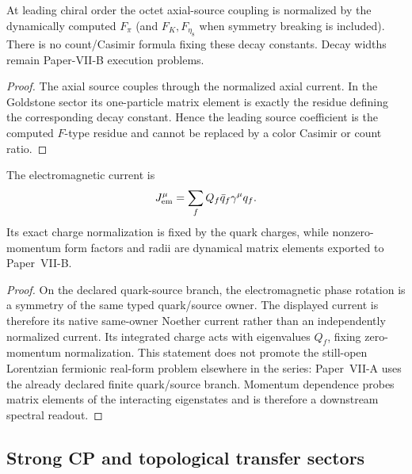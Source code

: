 \documentclass[12pt,a4paper]{article}
\begin{document}
\begin{theorem}
\label{p10:thm:native-leading-pseudoscalar-weak-decays}
At leading chiral order the octet axial-source coupling is normalized by the dynamically computed \(F_\pi\) (and \(F_K,F_{\eta_8}\) when symmetry breaking is included).  There is no count/Casimir formula fixing these decay constants.  Decay widths remain Paper-VII-B execution problems.
\end{theorem}
\begin{proof}
The axial source couples through the normalized axial current.  In the Goldstone sector its one-particle matrix element is exactly the residue defining the corresponding decay constant.  Hence the leading source coefficient is the computed $F$-type residue and cannot be replaced by a color Casimir or count ratio.
\end{proof}

\begin{theorem}
\label{p10:thm:native-electromagnetic-form-factor-bridge}
The electromagnetic current is
\begin{equation}
J_{\rm em}^{\mu}=\sum_f Q_f\bar q_f\gamma^\mu q_f.
\end{equation}
Its exact charge normalization is fixed by the quark charges, while nonzero-momentum form factors and radii are dynamical matrix elements exported to Paper~VII-B.
\end{theorem}
\begin{proof}
On the declared quark-source branch, the electromagnetic phase rotation is a symmetry of the same typed quark/source owner.  The displayed current is therefore its native same-owner Noether current rather than an independently normalized current.  Its integrated charge acts with eigenvalues $Q_f$, fixing zero-momentum normalization.  This statement does not promote the still-open Lorentzian fermionic real-form problem elsewhere in the series: Paper~VII-A uses the already declared finite quark/source branch.  Momentum dependence probes matrix elements of the interacting eigenstates and is therefore a downstream spectral readout.
\end{proof}


\subsection{Strong CP and topological transfer sectors}
\label{p10:sec:strong-cp-topology}
\end{document}
